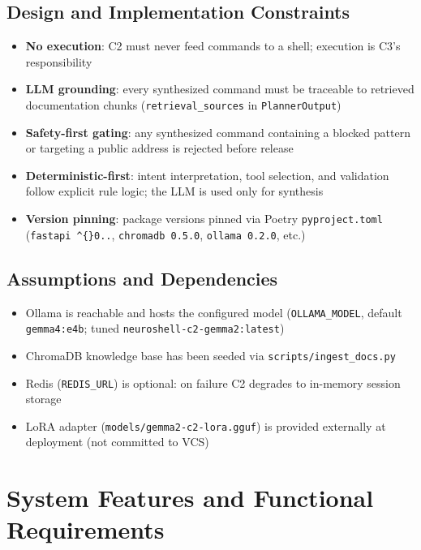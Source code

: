 \documentclass[10pt,journal,onecolumn]{IEEEtran}
\begin{document}
\subsection{Design and Implementation Constraints}

\begin{itemize}
\item \textbf{No execution}: C2 must never feed commands to a shell; execution is C3's responsibility
\item \textbf{LLM grounding}: every synthesized command must be traceable to retrieved documentation chunks (\texttt{retrieval\_sources} in \texttt{PlannerOutput})
\item \textbf{Safety-first gating}: any synthesized command containing a blocked pattern or targeting a public address is rejected before release
\item \textbf{Deterministic-first}: intent interpretation, tool selection, and validation follow explicit rule logic; the LLM is used only for synthesis
\item \textbf{Version pinning}: package versions pinned via Poetry \texttt{pyproject.toml} (\texttt{fastapi \textasciicircum\{\}0..}, \texttt{chromadb 0.5.0}, \texttt{ollama 0.2.0}, etc.)
\end{itemize}

\subsection{Assumptions and Dependencies}

\begin{itemize}
\item Ollama is reachable and hosts the configured model (\texttt{OLLAMA\_MODEL}, default \texttt{gemma4:e4b}; tuned \texttt{neuroshell-\allowbreak c2-\allowbreak gemma2:\allowbreak latest})
\item ChromaDB knowledge base has been seeded via \texttt{scripts/ingest\_docs.py}
\item Redis (\texttt{REDIS\_URL}) is optional: on failure C2 degrades to in-memory session storage
\item LoRA adapter (\texttt{models/\allowbreak gemma2-\allowbreak c2-\allowbreak lora.\allowbreak gguf}) is provided externally at deployment (not committed to VCS)
\end{itemize}

\section{System Features and Functional Requirements}
\end{document}
